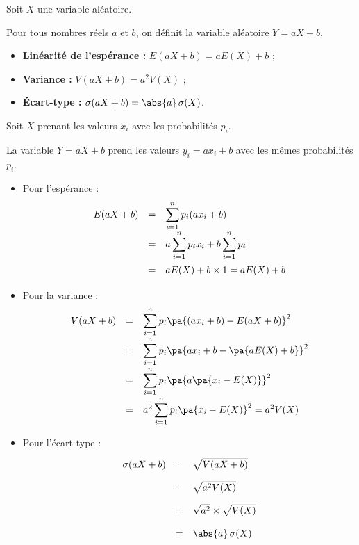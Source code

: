 \begin{prop}
	Soit $X$ une variable aléatoire.

	Pour tous nombres réels $a$ et $b$, on définit la variable aléatoire $Y = aX + b$.
	\begin{itemize}
		\item \textbf{Linéarité de l'espérance :} $E(aX + b) = a E(X) + b$ ;
		\item \textbf{Variance :} $V(aX + b) = a^2 V(X)$ ;
		\item \textbf{Écart-type :} $\sigma(aX + b) = \abs{a} \, \sigma(X)$.
	\end{itemize}
\end{prop}

\begin{demonstration}
	Soit $X$ prenant les valeurs $x_i$ avec les probabilités $p_i$.

	La variable $Y = aX + b$ prend les valeurs $y_i = a x_i + b$ avec les mêmes probabilités $p_i$.
	\begin{itemize}
		\item Pour l'espérance :
		      \[
			      \def\arraystretch{1.5}
			      \begin{array}{rcl}
				      E(aX + b) & = & \displaystyle\sum_{i=1}^{n} p_i (a x_i + b)                               \\[3mm]
				                & = & a \displaystyle\sum_{i=1}^{n} p_i x_i + b \displaystyle\sum_{i=1}^{n} p_i \\[3mm]
				                & = & a E(X) + b \times 1 = a E(X) + b
			      \end{array}
		      \]
		\item Pour la variance :
		      \[
			      \def\arraystretch{1.5}
			      \begin{array}{rcl}
				      V(aX + b) & = & \displaystyle\sum_{i=1}^{n} p_i \pa{(a x_i + b) - E(aX + b)}^2     \\[3mm]
				                & = & \displaystyle\sum_{i=1}^{n} p_i \pa{a x_i + b - \pa{a E(X) + b}}^2 \\[3mm]
				                & = & \displaystyle\sum_{i=1}^{n} p_i \pa{a \pa{x_i - E(X)}}^2           \\[3mm]
				                & = & a^2 \displaystyle\sum_{i=1}^{n} p_i \pa{x_i - E(X)}^2 = a^2 V(X)
			      \end{array}
		      \]
		\item Pour l'écart-type :
		      \[
			      \begin{array}{rcl}
				      \sigma(aX + b) & = & \sqrt{V(aX + b)}              \\[2mm]
				                     & = & \sqrt{a^2 V(X)}               \\[2mm]
				                     & = & \sqrt{a^2} \times \sqrt{V(X)} \\[2mm]
				                     & = & \abs{a} \, \sigma(X)
			      \end{array}
		      \]
	\end{itemize}
\end{demonstration}

